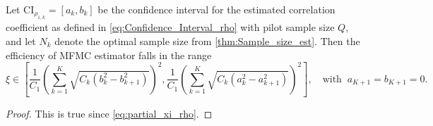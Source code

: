%
\begin{theorem}
\label{thm:Sample_size_est_conf_interval} 
Let $\text{CI}_{\rho_{1,k}}=[a_k,b_k]$ be the confidence interval for the estimated correlation coefficient as defined in \eqref{eq:Confidence_Interval_rho} with pilot sample size $Q$, and let $N_k$ denote the optimal sample size from \eqref{thm:Sample_size_est}. Then the efficiency of MFMC estimator falls in the range
%
\begin{equation}\label{eq:MFMC_sampling_cost_CI}
    \xi \in \left[ \frac{1}{C_1}\left(\sum_{k=1}^K\sqrt{C_k\left(b_{k}^2 - b_{k+1}^2\right)}\right)^2, \frac{1}{C_1}\left(\sum_{k=1}^K\sqrt{C_k\left(a_{k}^2 - a_{k+1}^2\right)}\right)^2\right],\quad \text{with}\;\;a_{K+1}=b_{K+1}=0.
\end{equation}
%
\begin{proof}
This is true since \eqref{eq:partial_xi_rho}.
\end{proof}

\end{theorem}




